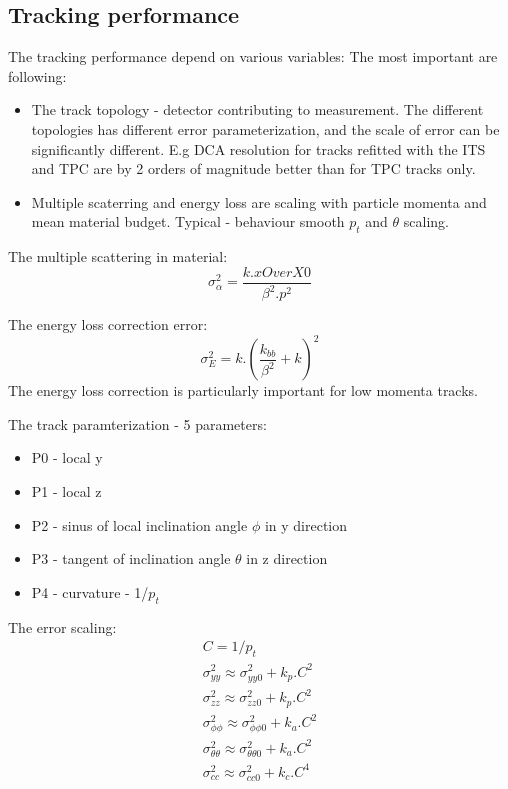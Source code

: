\documentclass{elsart}
\begin{document}
\subsection{Tracking performance}


The tracking performance depend on various variables:
The most important are following:
\begin{itemize}
\item The track topology - detector contributing to measurement.
      The different topologies has different error parameterization, and the scale of error
      can be  significantly different. E.g DCA resolution for tracks refitted with the 
      ITS and TPC are by 2 orders of magnitude better than for TPC tracks only.
      
\item Multiple scaterring and energy loss are scaling with particle momenta and mean material budget.
      Typical -  behaviour smooth $p_{t}$ and $\theta$ scaling.
\end{itemize} 

The multiple scattering in material:
\begin{equation}
\sigma^2_\alpha=\frac{k. xOverX0}{\beta^2.p^2}
\end{equation}

The energy loss correction error:
\begin{equation}
\sigma^2_E= k. (\frac{k_{bb}}{\beta^2} + k)^2
\end{equation}
The energy loss correction is particularly important for low momenta tracks.


The track paramterization - 5 parameters:
\begin{itemize}
\item P0 - local y
\item P1 - local z
\item P2 - sinus   of local inclination angle $\phi$ in y direction
\item P3 - tangent of inclination angle $\theta$ in z direction
\item P4 - curvature  - 1/$p_t$
\end{itemize}

The error scaling:
\begin{equation}
\begin{split}
C=1/p_t \\
\sigma^2_{yy} \approx   \sigma^2_{yy0}+ k_p.C^2 \\
\sigma^2_{zz} \approx   \sigma^2_{zz0}+ k_p.C^2 \\
\sigma^2_{\phi\phi}     \approx  \sigma^2_{\phi\phi0}+ k_a.C^2 \\
\sigma^2_{\theta\theta} \approx  \sigma^2_{\theta\theta0}+ k_a.C^2 \\
\sigma^2_{cc} \approx  \sigma^2_{cc0}+ k_c.C^4\\
\end{split}
\end{equation}
\end{document}
